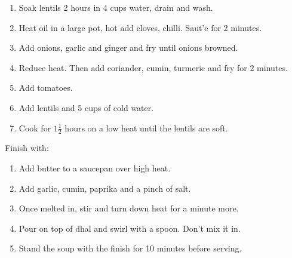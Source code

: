 \documentclass[11pt,a4paper]{article}
\begin{document}
\begin{enumerate}
  \item Soak lentils 2 hours in 4 cups water, drain and wash.
  \item Heat oil in a large pot, hot add cloves, chilli. Saut'{e} for 2 minutes.
  \item Add onions, garlic and ginger and fry until onions browned.
  \item Reduce heat. Then add coriander, cumin, turmeric and fry for 2 minutes.
  \item Add tomatoes.
  \item Add lentils and 5 cups of cold water.
  \item Cook for $1 \frac {1}{2}$ hours on a low heat until the lentils are soft.
\end{enumerate}

Finish with:

\begin{enumerate}
  \item Add butter to a saucepan over high heat.
  \item Add garlic, cumin, paprika and a pinch of salt.
  \item Once melted in, stir and turn down heat for a minute more.
  \item Pour on top of dhal and swirl with a spoon. Don't mix it in.
  \item Stand the soup with the finish for 10 minutes before serving.
\end{enumerate}
\end{document}
